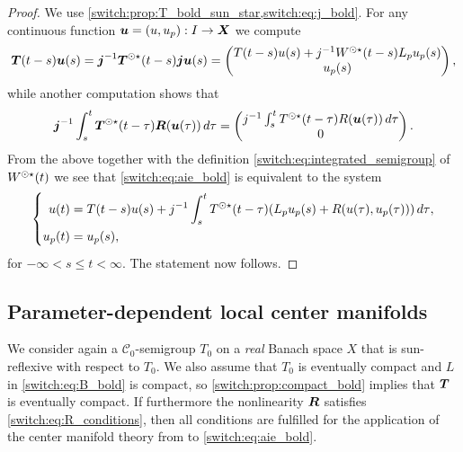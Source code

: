\begin{proof}
  We use \cref{switch:prop:T_bold_sun_star,switch:eq:j_bold}. For any continuous function $\boldsymbol{u} = (u, u_p) : I \to \boldsymbol{X}$ we compute
  \[
    \boldsymbol{T}(t - s)\boldsymbol{u}(s) = \boldsymbol{j}^{-1}\boldsymbol{T}^{\odot\star}(t - s)\boldsymbol{j}\boldsymbol{u}(s) =
    \begin{pmatrix}
      T(t - s)u(s) + j^{-1}W^{\odot\star}(t - s)L_p u_p(s)\\
      u_p(s)
    \end{pmatrix},
  \]
  while another computation shows that
  \[
    \boldsymbol{j}^{-1}\int_s^t{\boldsymbol{T}^{\odot\star}(t - \tau)\boldsymbol{R}(\boldsymbol{u}(\tau))\,d\tau} =
    \begin{pmatrix}
      j^{-1}\int_s^t{T^{\odot\star}(t - \tau)R(\boldsymbol{u}(\tau))\,d\tau}\\
      0
    \end{pmatrix}.
  \]
  From the above together with the definition \cref{switch:eq:integrated_semigroup} of $W^{\odot\star}(t)$ we see that \cref{switch:eq:aie_bold} is equivalent to the system
  \[
    \left\{
      \begin{aligned}
        u(t) &= T(t - s)u(s) + j^{-1}\int_s^t{T^{\odot\star}(t - \tau)(L_p u_p(s) + R(u(\tau),u_p(\tau)))\,d\tau},\\
        u_p(t) &= u_p(s),
      \end{aligned}
    \right.
  \]
   for $-\infty < s \le t < \infty$. The statement now follows.
\end{proof}

\subsection{Parameter-dependent local center manifolds}\label{switch:sec:cm_bold}
We consider again a $\mathcal{C}_0$-semigroup $T_0$ on a \emph{real} Banach space $X$ that is sun-reflexive with respect to $T_0$. We also assume that $T_0$ is eventually compact and $L$ in \cref{switch:eq:B_bold} is compact, so \cref{switch:prop:compact_bold} implies that $\boldsymbol{T}$ is eventually compact. If furthermore the nonlinearity $\boldsymbol{R}$ satisfies \cref{switch:eq:R_conditions}, then all conditions are fulfilled for the application of the center manifold theory from \cite[Chapter IX]{diekmann1995delay} to \cref{switch:eq:aie_bold}.

